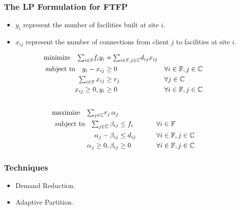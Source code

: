 \documentclass[handout, hyperref, xcolor=dvipsnames]{beamer}
\begin{document}
\begin{frame}
  \frametitle{The LP Formulation for FTFP}
  \begin{itemize}
  \item $y_i$ represent the number of facilities built at site $i$.
  \item $x_{ij}$ represent the number of connections from
    client $j$ to facilities at site $i$.
  \end{itemize}
  \begin{alignat}{3}
    \textrm{minimize}\quad \textstyle{\sum_{i\in \mathbb{F}}}f_iy_i &+ \textstyle{\sum_{i\in \mathbb{F}, j\in \mathbb{C}}}d_{ij}x_{ij}&\label{eqn:fac_primal}
    \\ \notag
    \textrm{subject to}\quad y_i - x_{ij} &\geq 0  & &\forall i\in \mathbb{F}, j\in \mathbb{C} 
    \\ \notag
    \textstyle{\sum_{i\in \mathbb{F}} x_{ij}} &\geq r_j & &\forall j\in \mathbb{C}
    \\ \notag
    x_{ij} \geq 0, y_i &\geq 0 & &\forall i\in \mathbb{F}, j\in \mathbb{C} 
    \\ \notag
  \end{alignat}
  \begin{alignat}{3}
    \textrm{maximize}\quad \textstyle{\sum_{j\in \mathbb{C}}} r_j\, \alpha_j&\label{eqn:fac_dual}  
    \\ \notag
    \textrm{subject to} \quad \textstyle{
      \sum_{j\in \mathbb{C}}\beta_{ij}} &\leq f_i  &\quad\quad			&\forall i \in \mathbb{F}  
    \\ \notag
    \alpha_{j} - \beta_{ij} 	&\leq  d_{ij}       &                 & \forall i\in \mathbb{F}, j\in \mathbb{C} 
    \\ \notag
    \alpha_j \geq 0, \beta_{ij} &\geq 0           &            & \forall i\in \mathbb{F}, j\in \mathbb{C}
  \end{alignat}
\end{frame}

\begin{frame}
  \frametitle{Techniques}
  \begin{itemize}
  \item Demand Reduction.
  \item Adaptive Partition.
  \end{itemize}
\end{frame}
\end{document}
